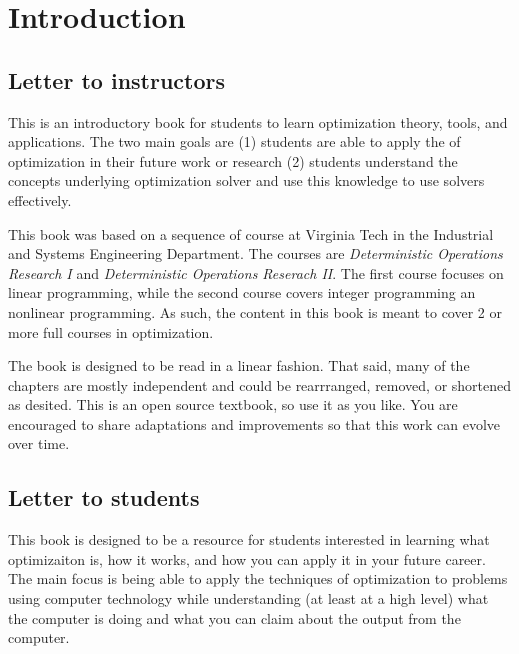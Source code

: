 \chapter*{Introduction}
\section*{Letter to instructors}
This is an introductory book for students to learn optimization theory, tools, and applications.  The two main goals are (1) students are able to apply the of optimization in their future work or research (2) students understand the concepts underlying optimization solver and use this knowledge to use solvers effectively.

This book was based on a sequence of course at Virginia Tech in the Industrial and Systems Engineering Department.   The courses are \emph{Deterministic Operations Research I} and \emph{Deterministic Operations Reserach II}.   The first course focuses on linear programming, while the second course covers integer programming an nonlinear programming.  As such, the content in this book is meant to cover 2 or more full courses in optimization.

The book is designed to be read in a linear fashion. That said, many of the chapters are mostly independent and could be rearrranged, removed, or shortened as desited.  This is an open source textbook, so use it as you like.  You are encouraged to share adaptations and improvements so that this work can evolve over time.




\section*{Letter to students}



This book is designed to be a resource for students interested in learning what optimizaiton is, how it works, and how you can apply it in your future career.  The main focus is being able to apply the techniques of optimization to problems using computer technology while understanding (at least at a high level) what the computer is doing and what you can claim about the output from the computer.


